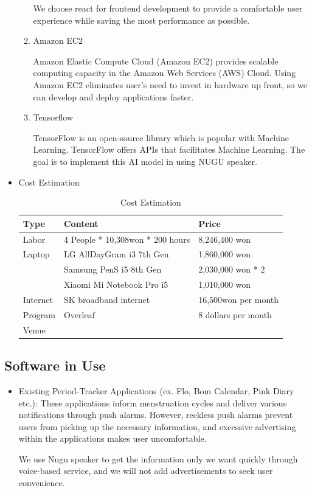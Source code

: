 \documentclass[conference]{IEEEtran}
\begin{document}
\begin{itemize}
\begin{enumerate}
        We choose react for frontend development to provide a comfortable user experience while saving the most performance as possible.
        \item Amazon EC2
        
        Amazon Elastic Compute Cloud (Amazon EC2) provides scalable computing capacity in the Amazon Web Services (AWS) Cloud. Using Amazon EC2 eliminates user’s need to invest in hardware up front, so we can develop and deploy applications faster. \cite{b8}
        \item Tensorflow
        
        TensorFlow is an open-source library which is popular with Machine Learning. TensorFlow offers APIs that facilitates Machine Learning.
        The goal is to implement this AI model in using NUGU speaker.
    \end{enumerate}
\end{itemize}

\begin{itemize}
    \item Cost Estimation
\begin{table}[h]
\centering
\caption{Cost Estimation}
\begin{tabular}[t]{p{0.8cm}p{3.4cm}p{2.5cm}}
\toprule
Type&Content&Price\\
\midrule
Labor&4 People * 10,308won * 200 hours&8,246,400 won\\
\rule{0in}{3ex}Laptop&LG AllDayGram i3 7th Gen&1,860,000 won\\
\rule{0in}{2ex}&Samsung PenS i5 8th Gen&2,030,000 won * 2\\
\rule{0in}{2ex}&Xiaomi Mi Notebook Pro i5&1,010,000 won\\
\rule{0in}{3ex}Internet&SK broadband internet&16,500won per month\\
\rule{0in}{3ex}Program&Overleaf&8 dollars per month\\
\rule{0in}{3ex}Venue&&\\
\bottomrule
\end{tabular}
\end{table}%

\end{itemize}
\subsection{Software in Use}
\begin{itemize}
    \setlength{\parindent}{2ex}
    \item Existing Period-Tracker Applications (ex. Flo, Bom Calendar, Pink Diary etc.): These applications inform menstruation cycles and deliver various notifications through push alarms. However, reckless push alarms prevent users from picking up the necessary information, and excessive advertising within the applications makes user uncomfortable.
    
    We use Nugu speaker to get the information only we want quickly through voice-based service, and we will not add advertisements to seek user convenience.
\end{itemize}
\end{document}
